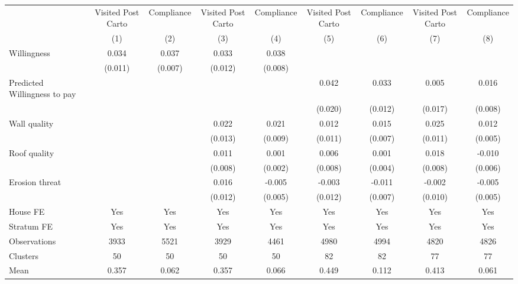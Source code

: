 \begin{tabular}{l*{8}{c}}
\toprule
                &\multicolumn{1}{c}{Visited Post Carto}&\multicolumn{1}{c}{Compliance}&\multicolumn{1}{c}{Visited Post Carto}&\multicolumn{1}{c}{Compliance}&\multicolumn{1}{c}{Visited Post Carto}&\multicolumn{1}{c}{Compliance}&\multicolumn{1}{c}{Visited Post Carto}&\multicolumn{1}{c}{Compliance}\\
                &\multicolumn{1}{c}{(1)}&\multicolumn{1}{c}{(2)}&\multicolumn{1}{c}{(3)}&\multicolumn{1}{c}{(4)}&\multicolumn{1}{c}{(5)}&\multicolumn{1}{c}{(6)}&\multicolumn{1}{c}{(7)}&\multicolumn{1}{c}{(8)}\\
\midrule
Willingness     &    0.034&    0.037&    0.033&    0.038&         &         &         &         \\
                &  (0.011)&  (0.007)&  (0.012)&  (0.008)&         &         &         &         \\
Predicted Willingness to pay&         &         &         &         &    0.042&    0.033&    0.005&    0.016\\
                &         &         &         &         &  (0.020)&  (0.012)&  (0.017)&  (0.008)\\
Wall quality    &         &         &    0.022&    0.021&    0.012&    0.015&    0.025&    0.012\\
                &         &         &  (0.013)&  (0.009)&  (0.011)&  (0.007)&  (0.011)&  (0.005)\\
Roof quality    &         &         &    0.011&    0.001&    0.006&    0.001&    0.018&   -0.010\\
                &         &         &  (0.008)&  (0.002)&  (0.008)&  (0.004)&  (0.008)&  (0.006)\\
Erosion threat  &         &         &    0.016&   -0.005&   -0.003&   -0.011&   -0.002&   -0.005\\
                &         &         &  (0.012)&  (0.005)&  (0.012)&  (0.007)&  (0.010)&  (0.005)\\
House FE        &      Yes&      Yes&      Yes&      Yes&      Yes&      Yes&      Yes&      Yes\\
Stratum FE      &      Yes&      Yes&      Yes&      Yes&      Yes&      Yes&      Yes&      Yes\\
\midrule
Observations    &     3933&     5521&     3929&     4461&     4980&     4994&     4820&     4826\\
Clusters        &       50&       50&       50&       50&       82&       82&       77&       77\\
Mean            &    0.357&    0.062&    0.357&    0.066&    0.449&    0.112&    0.413&    0.061\\
\bottomrule
\end{tabular}
